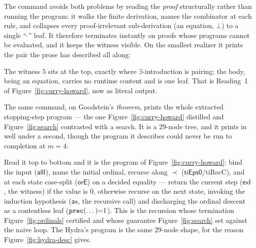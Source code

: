 \documentclass[11pt]{article}
\begin{document}
The command  avoids both problems by reading the \emph{proof}
structurally rather than running the program: it walks the finite derivation,
names the combinator at each rule, and collapses every proof-irrelevant
sub-derivation (an equation, $\bot$) to a single ``$\cdot$'' leaf. It therefore
terminates instantly on proofs whose programs cannot be evaluated, and it keeps
the witness visible. On the smallest realizer it prints the pair the prose has
described all along:

\begin{center}
\end{center}

\noindent
The witness $5$ sits at the top, exactly where $\exists$-introduction is pairing;
the body, being an equation, carries no runtime content and is one leaf. That is
Reading~1 of Figure~\ref{fig:curry-howard}, now as literal output.

The same command, on Goodstein's \emph{theorem}, prints the whole extracted
stopping-step program --- the one Figure~\ref{fig:curry-howard} distilled and
Figure~\ref{fig:search} contrasted with a search. It is a $29$-node tree, and it
prints in well under a second, though the program it describes could never be run
to completion at $m=4$:

\begin{center}
\end{center}

\noindent
Read it top to bottom and it is the program of Figure~\ref{fig:curry-howard}: bind
the input ($\mathsf{allI}$), name the initial ordinal, recurse along $\prec$
($\mathsf{tiEps0}/\mathrm{tiRecC}$), and at each state case-split
($\mathsf{orE}$) on a decided equality --- return the current step
($\mathsf{exI}$, the witness) if the value is $0$, otherwise recurse on the next
state, invoking the induction hypothesis ($\mathsf{ax}$, the recursive call) and
discharging the ordinal descent as a contentless leaf ($\texttt{prec}(\dots){=}1$).
This is the recursion whose termination Figure~\ref{fig:ordinals} certified and
whose guarantee Figure~\ref{fig:search} set against the naive loop. The Hydra's
program is the same $29$-node shape, for the reason Figure~\ref{fig:hydra-desc}
gives.
\end{document}

